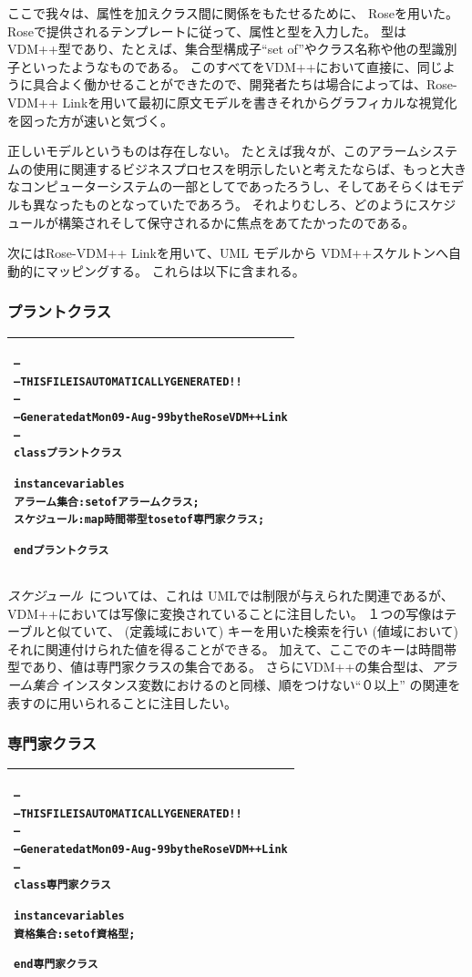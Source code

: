 \documentclass[\pformat,12pt,twoside]{jarticle}
\newenvironment{VDMgray}%
{\begin{tabular}{|G|}\hline\small\begin{alltt}}%
{\end{alltt}\normalsize\\
 \hline\end{tabular}}
\begin{document}
ここで我々は、属性を加えクラス間に関係をもたせるために、 Roseを用いた。
Roseで提供されるテンプレートに従って、属性と型を入力した。
型はVDM++型であり、たとえば、集合型構成子``set of''やクラス名称や他の型識別子といったようなものである。
このすべてをVDM++において直接に、同じように具合よく働かせることができたので、開発者たちは場合によっては、Rose-VDM++ Linkを用いて最初に原文モデルを書きそれからグラフィカルな視覚化を図った方が速いと気づく。

正しいモデルというものは存在しない。
たとえば我々が、このアラームシステムの使用に関連するビジネスプロセスを明示したいと考えたならば、もっと大きなコンピューターシステムの一部としてであったろうし、そしてあそらくはモデルも異なったものとなっていたであろう。
それよりむしろ、どのようにスケジュールが構築されそして保守されるかに焦点をあてたかったのである。

次にはRose-VDM++ Linkを用いて、UML モデルから VDM++スケルトンへ自動的にマッピングする。
これらは以下に含まれる。

\subsubsection*{プラントクラス}

\begin{VDMgray}
--
-- THIS FILE IS AUTOMATICALLY GENERATED!!
--
-- Generated at Mon 09-Aug-99 by the Rose VDM++ Link
--
class プラントクラス

instance variables
 アラーム集合 : set of アラームクラス;
 スケジュール : map 時間帯型 to set of 専門家クラス;

end プラントクラス

\end{VDMgray}

 \emph{スケジュール}\ については、これは UMLでは制限が与えられた関連であるが、VDM++においては写像に変換されていることに注目したい。
１つの写像はテーブルと似ていて、 (定義域において) キーを用いた検索を行い (値域において)それに関連付けられた値を得ることができる。
加えて、ここでのキーは時間帯型であり、値は専門家クラスの集合である。
さらにVDM++の集合型は、\emph{アラーム集合} インスタンス変数におけるのと同様、順をつけない``０以上'' の関連を表すのに用いられることに注目したい。

\subsubsection*{専門家クラス}

\begin{VDMgray}
--
-- THIS FILE IS AUTOMATICALLY GENERATED!!
--
-- Generated at Mon 09-Aug-99 by the Rose VDM++ Link
--
class 専門家クラス

instance variables
 資格集合 : set of 資格型;

end 専門家クラス

\end{VDMgray}
\end{document}
